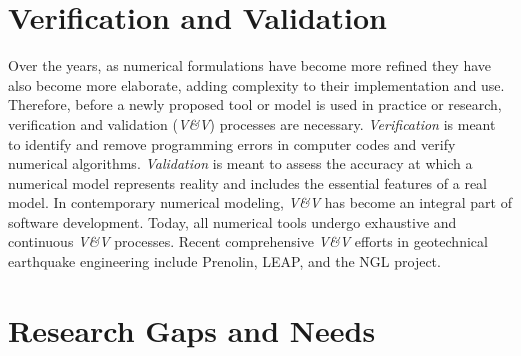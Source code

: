 \section{Verification and Validation} 
\label{sec:resp_geotech_7}

Over the years, as numerical formulations have become more refined they have also become more elaborate, adding complexity to their implementation and use. Therefore, before a newly proposed tool or model is used in practice or research, verification and validation (\emph{V\&V}) processes are necessary. \emph{Verification} is meant to identify and remove programming errors in computer codes and verify numerical algorithms. \emph{Validation} is meant to assess the accuracy at which a numerical model represents reality and includes the essential features of a real model. In contemporary numerical modeling, \emph{V\&V} has become an integral part of software development. Today, all numerical tools undergo exhaustive and continuous \emph{V\&V} processes. Recent comprehensive \emph{V\&V} efforts in geotechnical earthquake engineering include Prenolin, LEAP, and the NGL project. 

\section{Research Gaps and Needs}
\label{sec:resp_geotech_8}

